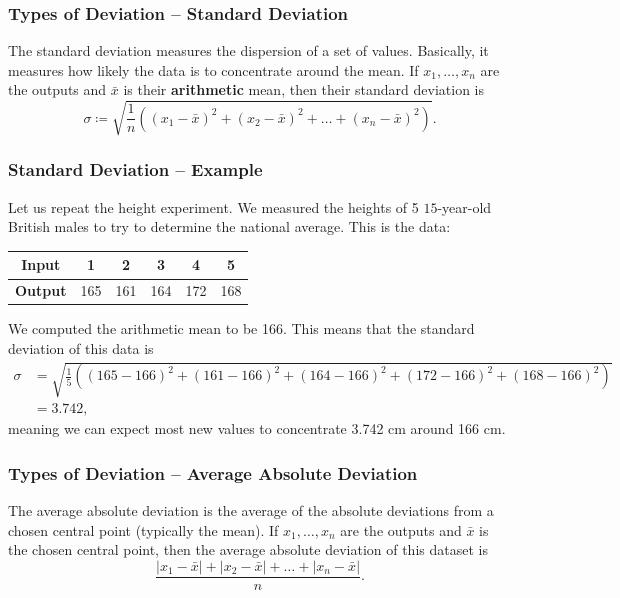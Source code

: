 \documentclass[aspectratio=169,11pt,svgnames,handout]{beamer}
\begin{document}
\begin{frame}
 \frametitle{Types of Deviation -- Standard Deviation}
 \begin{tcolorbox}[title=Standard Deviation]
  The \alert{standard deviation} measures the dispersion of a set of values.
  Basically, it measures how likely the data is to concentrate around the mean.
  If $x_1,\ldots,x_n$ are the outputs and $\bar{x}$ is their \textbf{arithmetic}
  mean, then their standard deviation is
  \[
   \sigma \coloneqq \sqrt{\frac{1}{n}((x_1-\bar{x})^2 +
   (x_2-\bar{x})^2+\ldots+(x_n-\bar{x})^2)}.
  \]
 \end{tcolorbox}
\end{frame}

\begin{frame}
 \frametitle{Standard Deviation -- Example}
 Let us repeat the height experiment. We measured the heights of 5 $15$-year-old
 British males to try to determine the national average. This is the data:
 \begin{center}
  \begin{tabular}{c|ccccc}
   \textbf{Input} & 1 & 2 & 3 & 4 & 5\\
   \midrule
   \textbf{Output} & 165 & 161 & 164 & 172 & 168
  \end{tabular}
 \end{center}
 \pause
 We computed the arithmetic mean to be 166. This means that the standard
 deviation of this data is
 \begin{align*}
  \sigma &= \sqrt{\frac{1}{5}((165 - 166)^2 + (161 -166)^2 + (164 - 166)^2 +
  (172-166)^2 + (168-166)^2)}\\
         &= 3.742,
 \end{align*}
 meaning we can expect most new values to concentrate 3.742 cm around 166 cm.
\end{frame}

\begin{frame}
 \frametitle{Types of Deviation -- Average Absolute Deviation}
 \begin{tcolorbox}[title=Average Absolute Deviation]
  The \alert{average absolute deviation} is the average of the absolute
  deviations from a chosen central point (typically the mean). If
  $x_1,\ldots,x_n$ are the outputs and $\bar{x}$ is the chosen central point,
  then the average absolute deviation of this dataset is
  \[
   \frac{|x_1 - \bar{x}| + |x_2 - \bar{x}| + \ldots + |x_n -\bar{x}|}{n}.
  \]
 \end{tcolorbox}
\end{frame}
\end{document}
